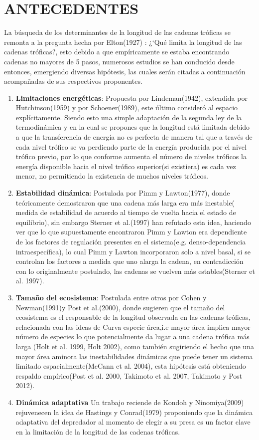 \documentclass[a4paper,12pt]{article}
\begin{document}
\section{ANTECEDENTES}
La b\'usqueda de los determinantes de la longitud de las cadenas tr\'oficas se remonta a la pregunta hecha por Elton(1927) : ¿`Qu\'e limita la longitud de las cadenas tr\'oficas?, esto debido a que emp\'iricamente se estaba encontrando cadenas no mayores de 5 pasos, numerosos estudios se han conducido desde entonces, emergiendo diversas hip\'otesis, las cuales ser\'an citadas a continuaci\'on acompa\~nadas de sus respectivos proponentes.\\
\begin{enumerate}
\item \textbf{Limitaciones energ\'eticas}: Propuesta por Lindeman(1942), extendida por Hutchinson(1959) y por Schoener(1989), este \'ultimo consider\'o al espacio expl\'icitamente. Siendo esto una simple adaptaci\'on de la segunda ley de la termodin\'amica y en la cual se propones que la longitud est\'a limitada debido a que la transferencia de energ\'ia no es perfecta de manera tal que a trav\'es de cada nivel tr\'ofico se va perdiendo parte de la energ\'ia producida por el nivel tr\'ofico previo, por lo que conforme aumenta el n\'umero de niveles tr\'oficos la energ\'ia disponible hacia el nivel tr\'ofico superior(si existiera) es cada vez menor, no permitiendo la existencia de muchos niveles tr\'oficos.
\item \textbf{Estabilidad din\'amica}: Postulada por Pimm y Lawton(1977), donde te\'oricamente demostraron que una cadena m\'as larga era m\'as inestable( medida de estabilidad de acuerdo al tiempo de vuelta hacia el estado de equilibrio), sin embargo Sterner et al.(1997) han refutado esta idea, haciendo ver que lo que supuestamente encontraron Pimm y Lawton era dependiente de los factores de regulaci\'on presentes en el sistema(e.g. denso-dependencia intraespec\'ifica), lo cual Pimm y Lawton incorporaron solo a nivel basal, si se controlan los factores a medida que uno alarga la cadena, en contradicci\'on con lo originalmente postulado, las cadenas se vuelven m\'as estables(Sterner et al. 1997).
\item \textbf{Tama\~no del ecosistema}: Postulada entre otros por Cohen y Newman(1991)y Post et al.(2000), donde sugieren que el tama\~no del ecosistema es el responsable de la longitud observada en las cadenas tr\'oficas, relacionada con las ideas de Curva especie-\'area,i.e mayor \'area implica mayor n\'umero de especies lo que potencialmente da lugar a una cadena tr\'ofica m\'as larga (Holt et al. 1999, Holt 2002), como tambi\'en sugiriendo el hecho que una mayor \'area aminora las inestabilidades din\'amicas  que puede tener un sistema limitado espacialmente(McCann et al. 2004), esta hip\'otesis est\'a obteniendo respaldo emp\'irico(Post et al. 2000, Takimoto et al. 2007, Takimoto y Post 2012).
\item \textbf{Din\'amica adaptativa} Un trabajo reciende de Kondoh y Ninomiya(2009) rejuvenecen la idea de Hastings y Conrad(1979) proponiendo que la din\'amica adaptativa del depredador al momento de elegir a su presa es un factor clave en la limitaci\'on de la longitud de las cadenas tr\'oficas.
\end{enumerate}
\end{document}
